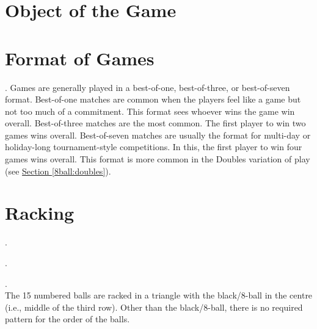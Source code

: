 


\section{Object of the Game} \label{8ball:description}

\section{Format of Games} \label{8ball:format}
\ex. Games are generally played in a best-of-one, best-of-three, or best-of-seven format.\itemspace
{}Best-of-one matches are common when the players feel like a game but not too much of a commitment. This format sees whoever wins the game win overall.\itemspace
{}Best-of-three matches are the most common. The first player to win two games wins overall.\itemspace
{}Best-of-seven matches are usually the format for multi-day or holiday-long tournament-style competitions. In this, the first player to win four games wins overall. This format is more common in the Doubles variation of play (see \hyperref[8ball:doubles]{Section \ref*{8ball:doubles}}).
\par

\section{Racking} \label{8ball:racking}
\ex. \RackingUp[8ball]\par
\ex. \label{8ball:challengerracks}\DetermineWhoRacks\par
\ex. \label{8ball:rackpos}\TableDiagram[8ball]\\
The 15 numbered balls are racked in a triangle with the black/8-ball in the centre (i.e., middle of the third row). Other than the black/8-ball, there is no required pattern for the order of the balls.\itemspace
{}\TightlyPacked\itemspace
{}\RackPlacement[8ball]\itemspace
{}\RackingTool[8ball]\itemspace
{}\RackInspection[8ball]
\par


